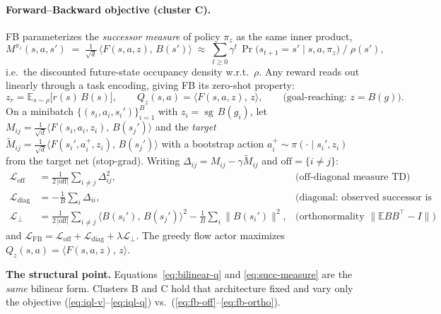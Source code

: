 \documentclass[11pt]{article}
\newcommand{\sg}{\operatorname{sg}}                 %
\newcommand{\E}{\mathbb{E}}
\newcommand{\inner}[2]{\langle #1,\, #2\rangle}
\newcommand{\Fmap}{F}                                %
\newcommand{\Bmap}{B}                                %
\begin{document}
\paragraph{Forward--Backward objective (cluster C).}
FB parameterizes the \emph{successor measure} of policy $\pi_z$ as the same
inner product,
\begin{equation}
  M^{\pi_z}(s,a,s') \;=\; \tfrac{1}{\sqrt d}\,\inner{\Fmap(s,a,z)}{\Bmap(s')}
  \;\approx\; \sum_{t\ge 0}\gamma^{t}\,\Pr\!\big(s_{t+1}=s'\mid s,a,\pi_z\big)
  \;\big/\;\rho(s'),
  \label{eq:succ-measure}
\end{equation}
i.e.\ the discounted future-state occupancy density w.r.t.\ $\rho$. Any reward
reads out linearly through a task encoding, giving FB its zero-shot property:
\begin{equation}
  z_r=\E_{s\sim\rho}\!\big[r(s)\,\Bmap(s)\big],
  \qquad
  Q_{z}(s,a)=\inner{\Fmap(s,a,z)}{z},
  \qquad\text{(goal-reaching: } z=\Bmap(g)\text{)}.
  \label{eq:fb-readout}
\end{equation}
On a minibatch $\{(s_i,a_i,s_i')\}_{i=1}^{B}$ with $z_i=\sg\,\Bmap(g_i)$, let
$M_{ij}=\tfrac1{\sqrt d}\inner{\Fmap(s_i,a_i,z_i)}{\Bmap(s_j')}$ and the
\emph{target} $\tilde M_{ij}=\tfrac1{\sqrt d}\inner{\Fmap(s_i',a_i^{+},z_i)}{\Bmap(s_j')}$
with a bootstrap action $a_i^{+}\sim\pi(\cdot\mid s_i',z_i)$ from the target net
(stop-grad). Writing $\Delta_{ij}=M_{ij}-\gamma\tilde M_{ij}$ and
$\mathrm{off}=\{i\ne j\}$:
\begin{align}
  \mathcal{L}_{\mathrm{off}}
    &= \frac{1}{2\,|\mathrm{off}|}\sum_{i\ne j}\Delta_{ij}^{2},
    &\text{(off-diagonal measure TD)}
    \label{eq:fb-off}\\
  \mathcal{L}_{\mathrm{diag}}
    &= -\frac{1}{B}\sum_{i}\Delta_{ii},
    &\text{(diagonal: observed successor is reachable)}
    \label{eq:fb-diag}\\
  \mathcal{L}_{\perp}
    &= \frac{1}{2\,|\mathrm{off}|}\sum_{i\ne j}\inner{\Bmap(s_i')}{\Bmap(s_j')}^{2}
       -\frac1B\sum_i\lVert\Bmap(s_i')\rVert^{2},
    &\text{(orthonormality } \lVert\E\Bmap\Bmap^{\!\top}-I\rVert)
    \label{eq:fb-ortho}
\end{align}
and $\mathcal{L}_{\mathrm{FB}}=\mathcal{L}_{\mathrm{off}}+\mathcal{L}_{\mathrm{diag}}+\lambda\mathcal{L}_{\perp}$.
The greedy flow actor maximizes $Q_z(s,a)=\inner{\Fmap(s,a,z)}{z}$.

\medskip
\noindent\textbf{The structural point.} Equations~\eqref{eq:bilinear-q} and
\eqref{eq:succ-measure} are the \emph{same} bilinear form. Clusters B and C hold
that architecture fixed and vary only the objective
(\ref{eq:iql-v}--\ref{eq:iql-q}) vs.\ (\ref{eq:fb-off}--\ref{eq:fb-ortho}).
\end{document}
